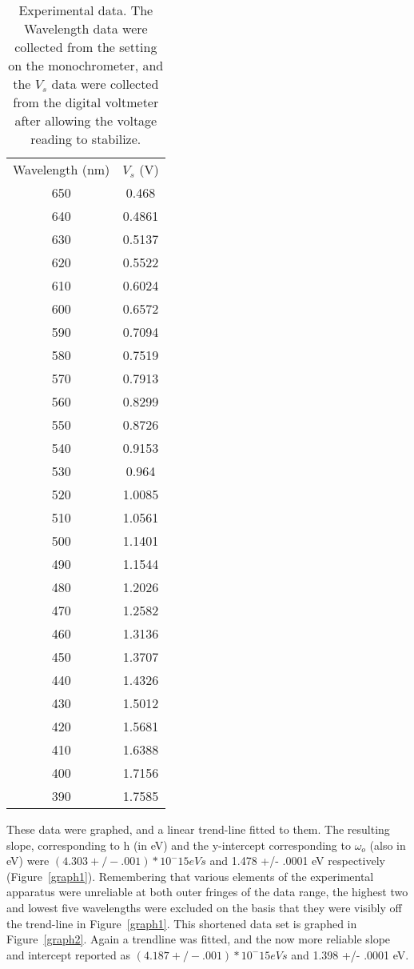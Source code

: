 \documentclass[aps,pre,twocolumn,nofootinbib]{revtex4}
\begin{document}
\begin{table}[h]
	\caption{Experimental data. The Wavelength data were collected from the setting on the monochrometer, and the $V_s$ data were collected from the digital voltmeter after allowing the voltage reading to stabilize.}
\begin{ruledtabular}
	\begin{tabular}{cc} 
Wavelength (nm) & $V_s$ (V) \\
650 & 0.468 \\
640 & 0.4861 \\
630 & 0.5137 \\
620 & 0.5522 \\
610 & 0.6024 \\
600 & 0.6572 \\
590 & 0.7094 \\
580 & 0.7519 \\
570 & 0.7913 \\
560 & 0.8299 \\
550 & 0.8726 \\
540 & 0.9153 \\
530 & 0.964 \\
520 & 1.0085 \\
510 & 1.0561 \\
500 & 1.1401 \\
490 & 1.1544 \\
480 & 1.2026 \\
470 & 1.2582 \\
460 & 1.3136 \\
450 & 1.3707 \\
440 & 1.4326 \\
430 & 1.5012 \\
420 & 1.5681 \\
410 & 1.6388 \\
400 & 1.7156 \\
390 & 1.7585 \\
	\end{tabular}
	\end{ruledtabular}
	\label{originaldata}
\end{table}

These data were graphed, and a linear trend-line fitted to them.  The resulting slope, corresponding to h (in eV) and the y-intercept corresponding to $\omega_o$ (also in eV) were $(4.303 +/- .001)*10^-15 eV s$ and 1.478 +/- .0001 eV respectively (Figure~\ref{graph1}).  Remembering that various elements of the experimental apparatus were unreliable at both outer fringes of the data range, the highest two and lowest five wavelengths were excluded on the basis that they were visibly off the trend-line in Figure~\ref{graph1}.  This shortened data set is graphed in Figure~\ref{graph2}.   Again a trendline was fitted, and the now more reliable slope and intercept reported as $(4.187 +/- .001)*10^-15 eV s$ and 1.398 +/- .0001 eV.  
\end{document}
